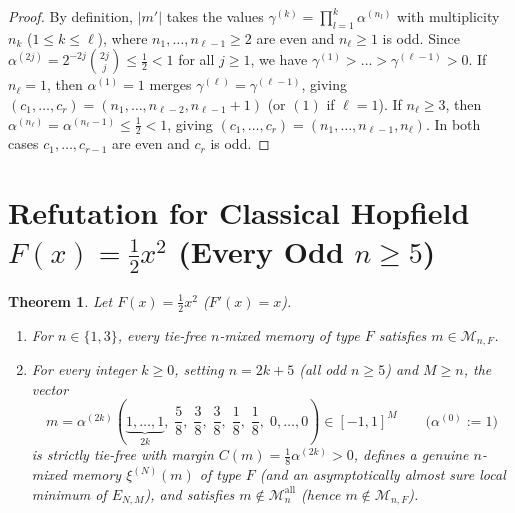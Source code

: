 \documentclass[11pt]{article}
\newtheorem{theorem}{Theorem}
\theoremstyle{definition}
\theoremstyle{remark}
\begin{document}
\begin{proof}
By definition, $|m'|$ takes the values $\gamma^{(k)} = \prod_{l=1}^k \alpha^{(n_l)}$ with multiplicity $n_k$ ($1 \le k \le \ell$), where $n_1, \dots, n_{\ell-1} \ge 2$ are even and $n_\ell \ge 1$ is odd. Since $\alpha^{(2j)} = 2^{-2j}\binom{2j}{j} \le \frac{1}{2} < 1$ for all $j \ge 1$, we have $\gamma^{(1)} > \dots > \gamma^{(\ell-1)} > 0$. If $n_\ell = 1$, then $\alpha^{(1)} = 1$ merges $\gamma^{(\ell)} = \gamma^{(\ell-1)}$, giving $(c_1,\dots,c_r) = (n_1,\dots,n_{\ell-2}, n_{\ell-1}+1)$ (or $(1)$ if $\ell=1$). If $n_\ell \ge 3$, then $\alpha^{(n_\ell)} = \alpha^{(n_\ell-1)} \le \frac{1}{2} < 1$, giving $(c_1,\dots,c_r) = (n_1,\dots,n_{\ell-1}, n_\ell)$. In both cases $c_1,\dots,c_{r-1}$ are even and $c_r$ is odd.
\end{proof}

\section{Refutation for Classical Hopfield \texorpdfstring{$F(x) = \frac{1}{2}x^2$}{F(x) = x\textasciicircum 2/2} (Every Odd \texorpdfstring{$n \ge 5$}{n >= 5})}

\begin{theorem}\label{thm:classical}
Let $F(x) = \frac{1}{2}x^2$ ($F'(x) = x$).
\begin{enumerate}[leftmargin=2em,itemsep=2pt]
  \item For $n \in \{1, 3\}$, every tie-free $n$-mixed memory of type $F$ satisfies $m \in \mathcal{M}_{n,F}$.
  \item For every integer $k \ge 0$, setting $n = 2k + 5$ (all odd $n \ge 5$) and $M \ge n$, the vector
  \[
    m = \alpha^{(2k)}\!\left(\underbrace{1,\dots,1}_{2k},\;\frac{5}{8},\;\frac{3}{8},\;\frac{3}{8},\;\frac{1}{8},\;\frac{1}{8},\;0,\dots,0\right) \in [-1,1]^M
    \qquad \bigl(\alpha^{(0)} := 1\bigr)
  \]
  is strictly tie-free with margin $C(m) = \frac{1}{8}\alpha^{(2k)} > 0$, defines a genuine $n$-mixed memory $\xi^{(N)}(m)$ of type $F$ (and an asymptotically almost sure local minimum of $E_{N,M}$), and satisfies $m \notin \mathcal{M}_n^{\mathrm{all}}$ (hence $m \notin \mathcal{M}_{n,F}$).
\end{enumerate}
\end{theorem}
\end{document}
